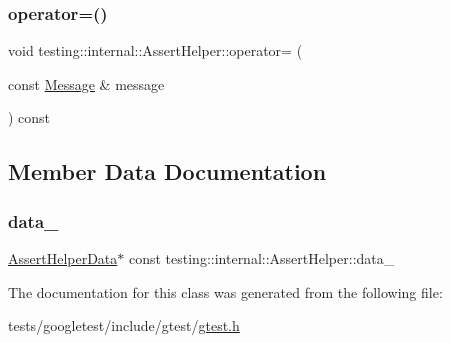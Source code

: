 \mbox{\label{classtesting_1_1internal_1_1AssertHelper_a97bf22d786131ab7baa86b97a27aeb4d}} 
\subsubsection{\texorpdfstring{operator=()}{operator=()}}
{\footnotesize\ttfamily void testing\+::internal\+::\+Assert\+Helper\+::operator= (\begin{DoxyParamCaption}\item[{const \hyperlink{classtesting_1_1Message}{Message} \&}]{message }\end{DoxyParamCaption}) const}



\subsection{Member Data Documentation}
\mbox{\label{classtesting_1_1internal_1_1AssertHelper_af69a4d66a929d0c6e419f4efd3ba6b3a}} 
\subsubsection{\texorpdfstring{data\+\_\+}{data\_}}
{\footnotesize\ttfamily \hyperlink{structtesting_1_1internal_1_1AssertHelper_1_1AssertHelperData}{Assert\+Helper\+Data}$\ast$ const testing\+::internal\+::\+Assert\+Helper\+::data\+\_\+\hspace{0.3cm}{\ttfamily [private]}}



The documentation for this class was generated from the following file\+:\begin{DoxyCompactItemize}
\item 
tests/googletest/include/gtest/\hyperlink{gtest_8h}{gtest.\+h}\end{DoxyCompactItemize}
